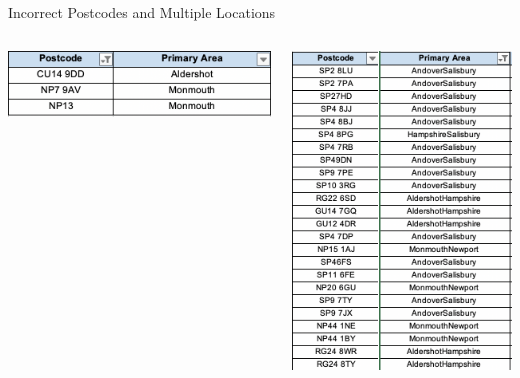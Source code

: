 \documentclass[usenames,dvipsnames]{beamer}
\begin{document}
\begin{frame}{Incorrect Postcodes and Multiple Locations}
\begin{columns}
	\begin{minipage}[c][1\textheight][c]{\linewidth}
		\includegraphics[width=1\linewidth]{figures/IncorrectPostcodes}
	\end{minipage}
	\begin{minipage}[c][1\textheight][c]{\linewidth}
		\includegraphics[width=0.8\linewidth]{figures/MultipleAreas}
	\end{minipage}
\end{columns}
\end{frame}
\end{document}
